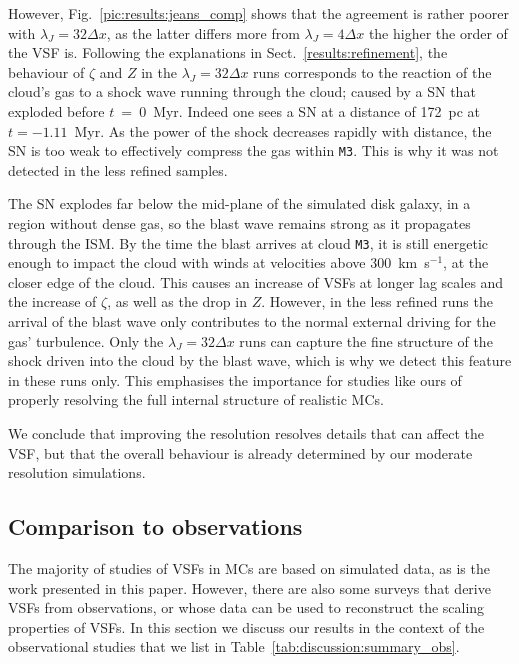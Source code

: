 However, Fig.~\ref{pic:results:jeans_comp} shows that the agreement is rather poorer with $\lambda_J=32\Delta{}x$, as the latter differs more from $\lambda_J=4\Delta{}x$ the higher the order of the VSF is.
Following the explanations in Sect.~\ref{results:refinement}, the behaviour of $\zeta$ and $Z$ in the $\lambda_J=32\Delta{}x$ runs corresponds to the reaction of the cloud's gas to a shock wave running through the cloud; caused by a SN that exploded before $t$~=~0~Myr. 
Indeed one sees a SN at a distance of 172~pc at $t=-1.11$~Myr. 
As the power of the shock decreases rapidly with distance, the SN is too weak to effectively compress the gas within \texttt{M3}.
This is why it was not detected in the less refined samples.

The SN explodes far below the mid-plane of the simulated disk galaxy, in a region without dense gas, so the blast wave remains strong as it propagates through the ISM. 
By the time the blast arrives at cloud \texttt{M3}, it is still energetic enough to impact the cloud with winds at velocities above 300~km~s$^{-1}$, at the closer edge of the cloud. 
This causes an increase of VSFs at longer lag scales and the increase of $\zeta$, as well as the drop in $Z$.
However, in the less refined runs the arrival of the blast wave only contributes to the normal external driving for the gas' turbulence.
Only the $\lambda_J=32\Delta{}x$ runs can capture the fine structure of the shock driven into the cloud by the blast wave, which is why we detect this feature in these runs only. 
This emphasises the importance for studies like ours of properly resolving the full internal structure of realistic MCs.

We conclude that improving the resolution resolves details that can affect the VSF, but that the overall behaviour is already determined by our moderate resolution simulations.

\subsection{Comparison to observations}\label{discussion:observation}

The majority of studies of VSFs in MCs are based on simulated data, as is the work presented in this paper.
However, there are also some surveys that derive VSFs from observations, or whose data can be used to reconstruct the scaling properties of VSFs. 
In this section we discuss our results in the context of the observational studies that we list in Table~\ref{tab:discussion:summary_obs}.

